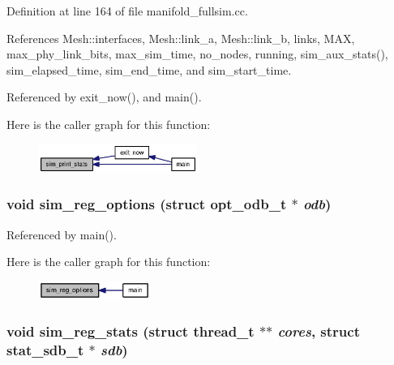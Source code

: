 Definition at line 164 of file manifold\_\-fullsim.cc.

References Mesh::interfaces, Mesh::link\_\-a, Mesh::link\_\-b, links, MAX, max\_\-phy\_\-link\_\-bits, max\_\-sim\_\-time, no\_\-nodes, running, sim\_\-aux\_\-stats(), sim\_\-elapsed\_\-time, sim\_\-end\_\-time, and sim\_\-start\_\-time.

Referenced by exit\_\-now(), and main().

Here is the caller graph for this function:\nopagebreak
\begin{figure}[H]
\begin{center}
\leavevmode
\includegraphics[width=146pt]{sim_8h_ebded8bcfea50ac2770a680b87509424_icgraph}
\end{center}
\end{figure}
\subsubsection[{sim\_\-reg\_\-options}]{\setlength{\rightskip}{0pt plus 5cm}void sim\_\-reg\_\-options (struct {\bf opt\_\-odb\_\-t} $\ast$ {\em odb})}\label{sim_8h_4452f31e857cb0adc1cd9ecc3be5f2ee}




Referenced by main().

Here is the caller graph for this function:\nopagebreak
\begin{figure}[H]
\begin{center}
\leavevmode
\includegraphics[width=103pt]{sim_8h_4452f31e857cb0adc1cd9ecc3be5f2ee_icgraph}
\end{center}
\end{figure}
\subsubsection[{sim\_\-reg\_\-stats}]{\setlength{\rightskip}{0pt plus 5cm}void sim\_\-reg\_\-stats (struct {\bf thread\_\-t} $\ast$$\ast$ {\em cores}, \/  struct {\bf stat\_\-sdb\_\-t} $\ast$ {\em sdb})}\label{sim_8h_e59ed09fba74951f34eea93edae2e721}




